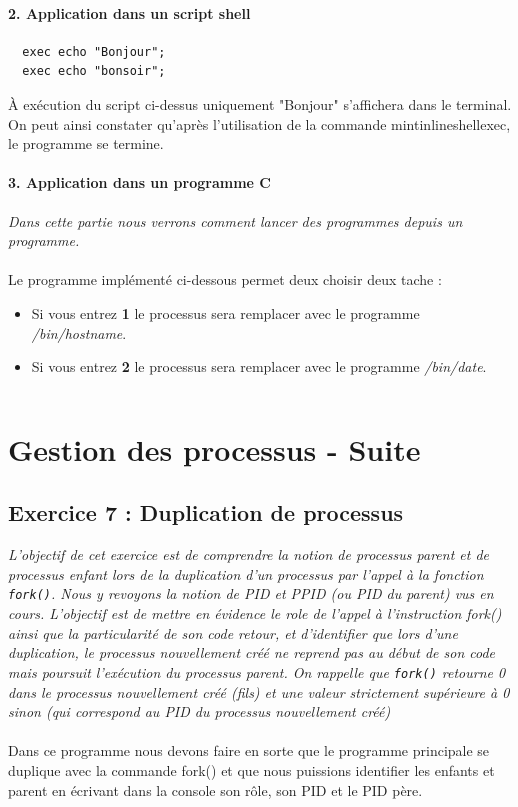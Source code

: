 \paragraph{2. Application dans un script shell}
\begin{verbatim}
  exec echo "Bonjour";
  exec echo "bonsoir";
\end{verbatim}
À exécution du script ci-dessus uniquement "Bonjour" s'affichera dans le terminal. On peut ainsi constater qu'après l'utilisation de la commande mintinline{shell}{exec}, le programme se termine.

\paragraph{3. Application dans un programme C}
\textit{Dans cette partie nous verrons comment lancer  des programmes depuis un programme.}
\\\\
Le programme implémenté ci-dessous permet deux choisir deux tache :
\begin{itemize}
\item Si vous entrez \textbf{1} le processus sera remplacer avec le programme \textit{/bin/hostname}.
\item Si vous entrez \textbf{2} le processus sera remplacer avec le programme \textit{/bin/date}.
\end{itemize}

\inputminted[linenos,firstline=8,lastline=23]{cpp}{../sources/cpp/TP5-6/ex6.c}

\section{Gestion des processus - Suite}
\subsection{Exercice 7 : Duplication de processus}
\textit{L’objectif de cet exercice est de comprendre la notion de processus parent et de processus enfant lors de la duplication d’un processus par l’appel à la fonction \texttt{fork()}. Nous y revoyons la notion de PID et PPID (ou PID du parent) vus en cours. L’objectif est de mettre en évidence le role de l’appel à l’instruction fork() ainsi que la particularité de son code retour, et d’identifier que lors d’une duplication, le processus nouvellement créé ne reprend pas au début de son code mais poursuit l’exécution du processus parent. On rappelle que \texttt{fork()} retourne 0 dans le processus nouvellement créé (fils) et une valeur strictement supérieure à 0 sinon (qui correspond au PID du processus nouvellement créé)}
\\\\
Dans ce programme nous devons faire en sorte que le programme principale se duplique avec la commande fork() et que nous puissions identifier les enfants et parent en écrivant dans la console son rôle, son PID et le PID père.

